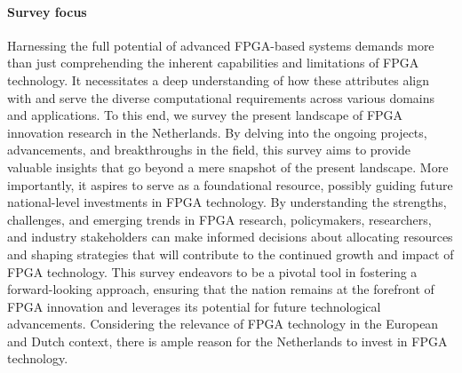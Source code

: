 \paragraph{Survey focus} Harnessing the full potential of advanced FPGA-based systems demands more than just comprehending the inherent capabilities and limitations of FPGA technology. It necessitates a deep understanding of how these attributes align with and serve the diverse computational requirements across various domains and applications. To this end, we survey the present landscape of FPGA innovation research in the Netherlands.  %
By delving into the ongoing projects, advancements, and breakthroughs in the field, this survey aims to provide valuable insights that go beyond a mere snapshot of the present landscape. More importantly, it aspires to serve as a foundational resource, possibly guiding future national-level investments in FPGA technology. By understanding the strengths, challenges, and emerging trends in FPGA research, policymakers, researchers, and industry stakeholders can make informed decisions about allocating resources and shaping strategies that will contribute to the continued growth and impact of FPGA technology. This survey endeavors to be a pivotal tool in fostering a forward-looking approach, ensuring that the nation remains at the forefront of FPGA innovation and leverages its potential for future technological advancements. Considering the relevance of FPGA technology in the European and Dutch context, there is ample reason for the Netherlands to invest in FPGA technology.

